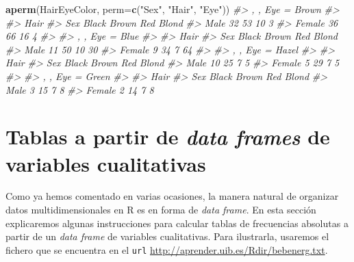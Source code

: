 \documentclass[
]{book}
\newenvironment{Shaded}{\begin{snugshade}}{\end{snugshade}}
\newcommand{\CommentTok}[1]{\textcolor[rgb]{0.56,0.35,0.01}{\textit{#1}}}
\newcommand{\DataTypeTok}[1]{\textcolor[rgb]{0.13,0.29,0.53}{#1}}
\newcommand{\KeywordTok}[1]{\textcolor[rgb]{0.13,0.29,0.53}{\textbf{#1}}}
\newcommand{\NormalTok}[1]{#1}
\newcommand{\StringTok}[1]{\textcolor[rgb]{0.31,0.60,0.02}{#1}}
\theoremstyle{definition}
\theoremstyle{definition}
\theoremstyle{definition}
\theoremstyle{remark}
\begin{document}
\begin{Shaded}
\begin{Highlighting}[]
\KeywordTok{aperm}\NormalTok{(HairEyeColor, }\DataTypeTok{perm=}\KeywordTok{c}\NormalTok{(}\StringTok{"Sex"}\NormalTok{, }\StringTok{"Hair"}\NormalTok{, }\StringTok{"Eye"}\NormalTok{))}
\CommentTok{\#\textgreater{} , , Eye = Brown}
\CommentTok{\#\textgreater{} }
\CommentTok{\#\textgreater{}         Hair}
\CommentTok{\#\textgreater{} Sex      Black Brown Red Blond}
\CommentTok{\#\textgreater{}   Male      32    53  10     3}
\CommentTok{\#\textgreater{}   Female    36    66  16     4}
\CommentTok{\#\textgreater{} }
\CommentTok{\#\textgreater{} , , Eye = Blue}
\CommentTok{\#\textgreater{} }
\CommentTok{\#\textgreater{}         Hair}
\CommentTok{\#\textgreater{} Sex      Black Brown Red Blond}
\CommentTok{\#\textgreater{}   Male      11    50  10    30}
\CommentTok{\#\textgreater{}   Female     9    34   7    64}
\CommentTok{\#\textgreater{} }
\CommentTok{\#\textgreater{} , , Eye = Hazel}
\CommentTok{\#\textgreater{} }
\CommentTok{\#\textgreater{}         Hair}
\CommentTok{\#\textgreater{} Sex      Black Brown Red Blond}
\CommentTok{\#\textgreater{}   Male      10    25   7     5}
\CommentTok{\#\textgreater{}   Female     5    29   7     5}
\CommentTok{\#\textgreater{} }
\CommentTok{\#\textgreater{} , , Eye = Green}
\CommentTok{\#\textgreater{} }
\CommentTok{\#\textgreater{}         Hair}
\CommentTok{\#\textgreater{} Sex      Black Brown Red Blond}
\CommentTok{\#\textgreater{}   Male       3    15   7     8}
\CommentTok{\#\textgreater{}   Female     2    14   7     8}
\end{Highlighting}
\end{Shaded}

\hypertarget{tablas-a-partir-de-data-frames-de-variables-cualitativas}{%
\section{\texorpdfstring{Tablas a partir de \emph{data frames} de variables cualitativas}{Tablas a partir de data frames de variables cualitativas}}\label{tablas-a-partir-de-data-frames-de-variables-cualitativas}}

Como ya hemos comentado en varias ocasiones, la manera natural de organizar datos multidimensionales en R es en forma de \emph{data frame}. En esta sección explicaremos algunas instrucciones para calcular tablas de frecuencias absolutas a partir de un \emph{data frame} de variables cualitativas. Para ilustrarla, usaremos el fichero que se encuentra en el \texttt{url} \url{http://aprender.uib.es/Rdir/bebenerg.txt}.
\end{document}
